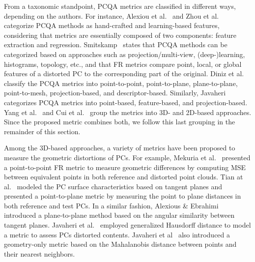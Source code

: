 \documentclass[final,3p,times,twocolumn]{elsarticle}
\begin{document}
From a taxonomic standpoint, \gls{PCQA} metrics are classified in different ways, depending on the authors. For instance, Alexiou et al.~\cite{alexiou2024pointpca} and Zhou et al.~\cite{zhou2023pointpca+, zhou2025pointpca+} categorize \gls{PCQA} methods as hand-crafted and learning-based features, considering that metrics are essentially composed of two components: feature extraction and regression. Smitskamp~\cite{smitskamp2022no} states that \gls{PCQA} methods can be categorized based on approaches such as projection/multi-view, (deep-)learning, histograms, topology, etc., and that \gls{FR} metrics compare point, local, or global features of a distorted \gls{PC} to the corresponding part of the original. Diniz et al.~\cite{DINIZ202231} classify the \gls{PCQA} metrics into point-to-point, point-to-plane, plane-to-plane, point-to-mesh, projection-based, and descriptor-based. Similarly, Javaheri~\cite{Javaheri-Point-cloud-quality-assessment} categorizes \gls{PCQA} metrics into point-based, feature-based, and projection-based. Yang et al.~\cite{yang2020predicting} and Cui et al.~\cite{Cui2024Colored} group the metrics into 3D- and 2D-based approaches. Since the proposed metric combines both, we follow this last grouping in the remainder of this section.

Among the \gls{3D}-based approaches, a variety of metrics have been proposed to measure the geometric distortions of \glspl{PC}. For example, Mekuria et al.~\cite{mekuria2017performance} presented a point-to-point \gls{FR} metric to measure geometric differences by computing \gls{MSE} between equivalent points in both reference and distorted point clouds. Tian at al.~\cite{tian2017geometric} modeled the \gls{PC} surface characteristics based on tangent planes and presented a point-to-plane metric by measuring the point to plane distances in both reference and test \glspl{PC}. In a similar fashion, Alexious \& Ebrahimi~\cite{alexiou2018pointangular} introduced a plane-to-plane method based on the angular similarity between tangent planes. Javaheri et al.~\cite{javaheri2020generalized} employed generalized Hausdorff distance to model a metric to assess \glspl{PC} distorted contents. Javaheri et al~\cite{javaheri2020generalized} also introduced a geometry-only metric based on the Mahalanobis distance between points and their nearest neighbors.
\end{document}
